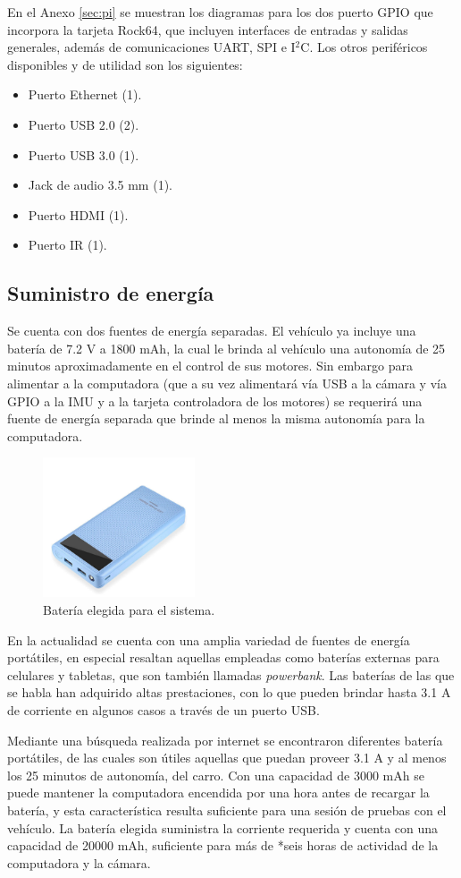 \par En el Anexo \ref{sec:pi} se muestran los diagramas para los dos puerto GPIO que incorpora la tarjeta Rock64, que incluyen interfaces de entradas y salidas generales, además de comunicaciones UART, SPI e I$^{2}$C. Los otros periféricos disponibles y de utilidad son los siguientes:
\begin{itemize}
	\item Puerto Ethernet (1).
	\item Puerto USB 2.0 (2).
	\item Puerto USB 3.0 (1).
	\item Jack de audio 3.5 mm (1).
	\item Puerto HDMI (1).
	\item Puerto IR (1).
\end{itemize}
\subsection{Suministro de energía}
\label{ssec:ener}
Se cuenta con dos fuentes de energía separadas. El vehículo ya incluye una batería de 7.2 V a 1800 mAh, la cual le brinda al vehículo una autonomía de 25 minutos aproximadamente en el control de sus motores. Sin embargo para alimentar a la computadora (que a su vez alimentará vía USB a la cámara y vía GPIO a la IMU y a la tarjeta controladora de los motores) se requerirá una fuente de energía separada que brinde al menos la misma autonomía para la computadora.
\begin{figure}[htbp!]
	\centering
	\includegraphics[width=0.4\textwidth]{./Figuras/Power}
	\caption{Batería elegida para el sistema.}
	\label{fig:power}
\end{figure}
\par En la actualidad se cuenta con una amplia variedad de fuentes de energía portátiles, en especial resaltan aquellas empleadas como baterías externas para celulares y tabletas, que son también llamadas {\it powerbank}. Las baterías de las que se habla han adquirido altas prestaciones, con lo que pueden brindar hasta 3.1 A de corriente en algunos casos a través de un puerto USB.
\par Mediante una búsqueda realizada por internet se encontraron diferentes batería portátiles, de las cuales son útiles aquellas que puedan proveer 3.1 A y al menos los 25 minutos de autonomía, del carro. Con una capacidad de 3000 mAh se puede mantener la computadora encendida por una hora antes de recargar la batería, y esta característica resulta suficiente para una sesión de pruebas con el vehículo. La batería elegida suministra la corriente requerida y cuenta con una capacidad de 20000 mAh, suficiente para más de *seis horas de actividad de la computadora y la cámara.
